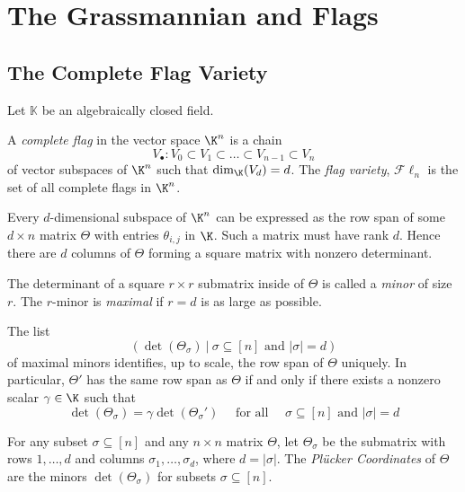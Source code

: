 \section{The Grassmannian and Flags}

\subsection{The Complete Flag Variety}

Let $\mathbb{K}$ be an algebraically closed field.

\begin{definition}
    A \textit{complete flag} in the vector space $\K^n$ is a chain
    $$V_{\bullet} : V_{0} \subset V_1 \subset \dots \subset V_{n-1} \subset V_{n} $$
    of vector subspaces of $\K^n$ such that $\text{dim}_{\K}(V_d) = d$.
    The \textit{flag variety}, $\mathcal{F}\ell_n$ is the set of all complete flags in $\K^n$.
\end{definition}

Every $d$-dimensional subspace of $\K^n$ can be expressed as the row span of some $d \times n$ matrix $\Theta$ with entries $\theta_{i,j}$ in $\K$.
Such a matrix must have rank $d$.
Hence there are $d$ columns of $\Theta$ forming a square matrix with nonzero determinant.

\begin{definition}[Minor]
    The determinant of a square $r \times r$ submatrix inside of $\Theta$ is called a \textit{minor} of size $r$.
    The $r$-minor is \textit{maximal} if $r = d$ is as large as possible.
\end{definition}

\begin{proposition}
    The list
    $$(\det (\Theta_{\sigma}) \: | \: \sigma \subseteq [n] \text{ and } |\sigma| = d)$$
    of maximal minors identifies, up to scale, the row span of $\Theta$ uniquely.
    In particular, $\Theta'$ has the same row span as $\Theta$ if and only if there exists a nonzero scalar $\gamma \in \K$ such that
    $$\det(\Theta_{\sigma}) = \gamma \det(\Theta_{\sigma}') \quad \text{ for all } \quad \sigma \subseteq [n] \text{ and } |\sigma| = d$$
\end{proposition}

\begin{definition}
    For any subset $\sigma \subseteq [n]$ and any $n \times n$ matrix $\Theta$, let $\Theta_{\sigma}$ be the submatrix with rows $1, \dots, d$ and columns $\sigma_1, \dots, \sigma_{d}$, where $d = |\sigma|$.
    The \textit{Pl\"ucker Coordinates} of $\Theta$ are the minors $\det(\Theta_{\sigma})$ for subsets $\sigma \subseteq [n]$.
\end{definition}

